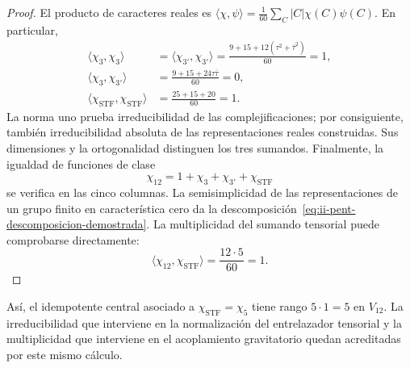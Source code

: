 \begin{proof}
El producto de caracteres reales es
\(\langle\chi,\psi\rangle
=\frac1{60}\sum_C|C|\chi(C)\psi(C)\).
En particular,
\begin{align*}
 \langle\chi_3,\chi_3\rangle
 &=\langle\chi_{3'},\chi_{3'}\rangle
 =\frac{9+15+12(\tau^2+\bar\tau^2)}{60}=1,\\
 \langle\chi_3,\chi_{3'}\rangle
 &=\frac{9+15+24\tau\bar\tau}{60}=0,\\
 \langle\chi_{\mathrm{STF}},\chi_{\mathrm{STF}}\rangle
 &=\frac{25+15+20}{60}=1.
\end{align*}
La norma uno prueba irreducibilidad de las complejificaciones; por
consiguiente, también irreducibilidad absoluta de las representaciones
reales construidas. Sus dimensiones y la ortogonalidad distinguen los
tres sumandos. Finalmente, la igualdad de funciones de clase
\[
 \chi_{12}=1+\chi_3+\chi_{3'}+\chi_{\mathrm{STF}}
\]
se verifica en las cinco columnas. La semisimplicidad de las
representaciones de un grupo finito en característica cero da la
descomposición~\eqref{eq:ii-pent-descomposicion-demostrada}. La
multiplicidad del sumando tensorial puede comprobarse directamente:
\[
 \langle\chi_{12},\chi_{\mathrm{STF}}\rangle
 =\frac{12\cdot5}{60}=1.
\]
\end{proof}

Así, el idempotente central asociado a
\(\chi_{\mathrm{STF}}=\chi_5\) tiene rango
\(5\cdot1=5\) en \(V_{12}\). La irreducibilidad que interviene
en la normalización del entrelazador tensorial y la multiplicidad que
interviene en el acoplamiento gravitatorio quedan acreditadas por
este mismo cálculo.

